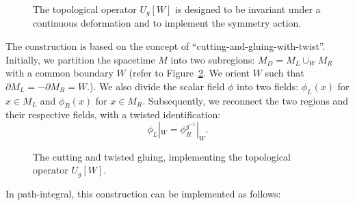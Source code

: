 \documentclass[
  letterpaper,
  DIV=11,
  numbers=noendperiod]{scrreport}
\newcommand{\stdim}{D}
\begin{document}
\begin{figure}[t]


\caption{\label{fig-op-action}The topological operator \(U_g[W]\) is
designed to be invariant under a continuous deformation and to implement
the symmetry action.}

\end{figure}%

The construction is based on the concept of
``cutting-and-gluing-with-twist''. Initially, we partition the spacetime
\(M\) into two subregions: \(M_\stdim = M_L \cup_W M_R\) with a common
boundary \(W\) (refer to Figure~\ref{fig-cut-M}. We orient \(W\) such
that \(\partial M_L = -\partial M_R = W\).). We also divide the scalar
field \(\phi\) into two fields: \(\phi_L(x)\) for \(x \in M_L\) and
\(\phi_R(x)\) for \(x \in M_R\). Subsequently, we reconnect the two
regions and their respective fields, with a twisted identification:
\[ \phi_L|_W = \phi_R^{g^{-1}}|_W. \]

\begin{figure}[t]


\caption{\label{fig-cut-M}The cutting and twisted gluing, implementing
the topological operator \(U_g[W]\).}

\end{figure}%

In path-integral, this construction can be implemented as follows:
\end{document}
